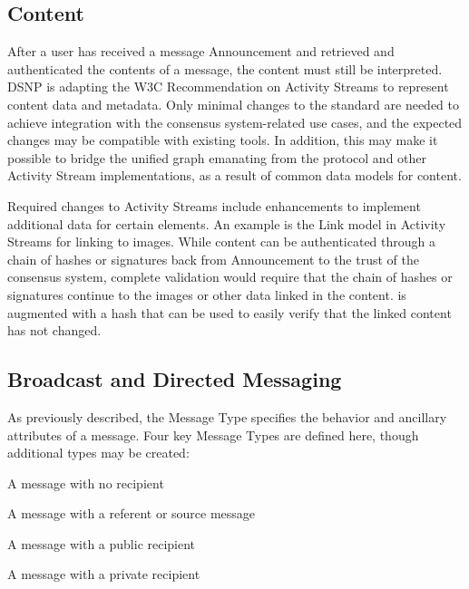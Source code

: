 \documentclass[12pt,letterpaper]{article}
\providecommand{\tightlist}{%
\setlength{\itemsep}{0pt}\setlength{\parskip}{0pt}}
\begin{document}
\subsection{Content}\label{sec:content}

After a user has received a message Announcement and retrieved and authenticated the
contents of a message, the content must still be interpreted. DSNP is adapting the W3C
Recommendation on Activity Streams\cite{activitypub} to represent content data and
metadata. Only minimal changes to the standard are needed to achieve integration with the
consensus system-related use cases, and the expected changes may be compatible with existing
tools. In addition, this may make it possible to bridge the unified graph emanating from the
protocol and other Activity Stream implementations, as a result of common data models for
content.

Required changes to Activity Streams include enhancements to implement additional data for
certain elements. An example is the Link model in Activity Streams for linking to images.
While content can be authenticated through a chain of hashes or signatures back from
Announcement to the trust of the consensus system, complete validation would require that
the chain of hashes or signatures continue to the images or other data linked in the
content.   is augmented with a hash that can be used to easily verify that the
linked content has not changed.

\subsection{Broadcast and Directed Messaging}\label{sec:broadcast_and_directed_messaging}

As previously described, the Message Type specifies the behavior and ancillary attributes of
a message. Four key Message Types are defined here, though additional types may be created:

\begin{samepage}
	\begin{description}
		\tightlist
		\item[Broadcast:]
		      A message with no recipient
		\item[Reply:]
		      A message with a referent or source message
		\item[Direct:]
		      A message with a public recipient
		\item[Dead Drop:]
		      A message with a private recipient
	\end{description}
\end{samepage}
\end{document}
